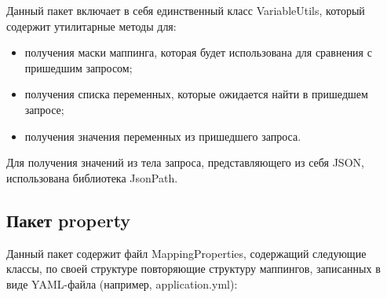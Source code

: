 Данный пакет включает в себя единственный класс VariableUtils, который содержит утилитарные методы для:

\begin{itemize}
	\item получения маски маппинга, которая будет использована для сравнения с пришедшим запросом;
	\item получения списка переменных, которые ожидается найти в пришедшем запросе;
	\item получения значения переменных из пришедшего запроса.
\end{itemize}

Для получения значений из тела запроса, представляющего из себя JSON, использована библиотека JsonPath.

\subsection{Пакет property}

Данный пакет содержит файл MappingProperties, содержащий следующие классы, по своей структуре повторяющие структуру маппингов, записанных в виде YAML-файла (например, application.yml):

